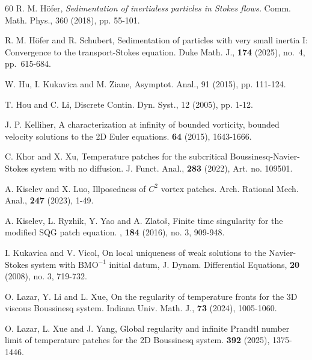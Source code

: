 \documentclass[reqno,11pt,a4paper]{amsart}
\begin{document}
\begin{thebibliography}{60}
R. M. H\"ofer, {\it Sedimentation of inertialess particles in Stokes flows.}
Comm. Math. Phys., 360 (2018), pp. 55-101.


R. M. H\"ofer and R. Schubert,
Sedimentation of particles with very small inertia I: Convergence to the transport-Stokes equation.
Duke Math. J., \textbf{174} (2025), no.~4, pp.~615-684.

W. Hu, I. Kukavica and M. Ziane,  Asymptot. Anal., 91 (2015), pp. 111-124.

 T. Hou and C. Li,  Discrete Contin.
Dyn. Syst., 12 (2005), pp. 1-12.

J. P. Kelliher,
A characterization at infinity of bounded vorticity, bounded velocity solutions to the 2D Euler equations.
 \textbf{64} (2015), 1643-1666.

C. Khor and X. Xu, 
Temperature patches for the subcritical Boussinesq-Navier-Stokes system with no diffusion.
J. Funct. Anal., \textbf{283} (2022), Art. no. 109501.

A. Kiselev and X. Luo,
Illposedness of $C^2$ vortex patches.
Arch. Rational Mech. Anal.,  \textbf{247} (2023), 1-49.


A. Kiselev, L. Ryzhik, Y. Yao and A. Zlato\v{s},
\newblock Finite time singularity for the modified {SQG} patch equation.
, \textbf{184} (2016), no. 3, 909-948.

I. Kukavica and V. Vicol,
On local uniqueness of weak solutions to the
Navier-Stokes system with $\mathrm{BMO}^{-1}$ initial datum,
J. Dynam. Differential Equations,
\textbf{20} (2008), no. 3, 719-732.

 O. Lazar, Y. Li and L. Xue,
On the regularity of temperature fronts for the 3D viscous Boussinesq system.
Indiana Univ. Math. J., \textbf{73} (2024), 1005-1060.

O. Lazar, L. Xue and J. Yang,
Global regularity and infinite Prandtl number limit of temperature patches for the 2D Boussinesq system.
  \textbf{392} (2025), 1375-1446.


\end{thebibliography}
\end{document}
